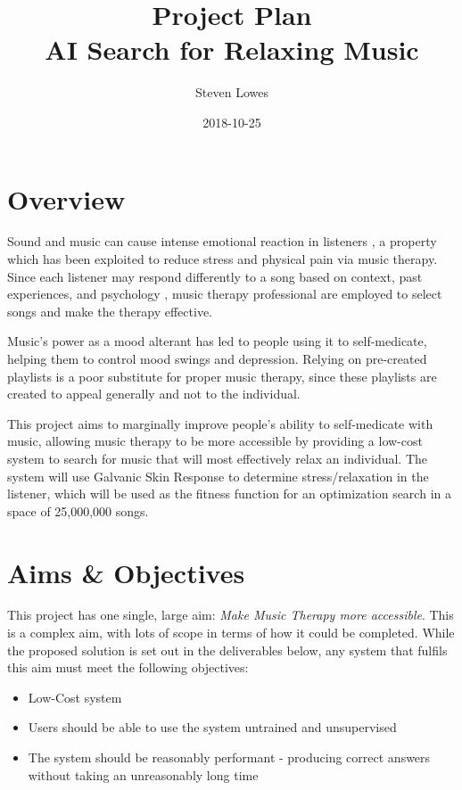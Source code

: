 \documentclass{article}
\title{Project Plan\\{\large AI Search for Relaxing Music}}
\author{Steven Lowes}
\date{2018-10-25}
\begin{document}
	\maketitle
	\section{Overview}
	Sound and music can cause intense emotional reaction in listeners \cite{rickard_intense_2004}, a property which has been exploited to reduce stress and physical pain via music therapy. Since each listener may respond differently to a song based on context, past experiences, and psychology \cite{garrido_individual_2011}, music therapy professional are employed to select songs and make the therapy effective.
	
	Music's power as a mood alterant has led to people using it to self-medicate, helping them to control mood swings and depression. Relying on pre-created playlists is a poor substitute for proper music therapy, since these playlists are created to appeal generally and not to the individual.
	
	This project aims to marginally improve people's ability to self-medicate with music, allowing music therapy to be more accessible by providing a low-cost system to search for music that will most effectively relax an individual. The system will use Galvanic Skin Response to determine stress/relaxation in the listener, which will be used as the fitness function for an optimization search in a space of 25,000,000 songs.
	
	\section{Aims \& Objectives}
	This project has one single, large aim: \emph{Make Music Therapy more accessible}. This is a complex aim, with lots of scope in terms of how it could be completed. While the proposed solution is set out in the deliverables below, any system that fulfils this aim must meet the following objectives:
	
	\begin{itemize}
		\item Low-Cost system
		\item Users should be able to use the system untrained and unsupervised
		\item The system should be reasonably performant - producing correct answers without taking an unreasonably long time
	\end{itemize}
	
\end{document}
